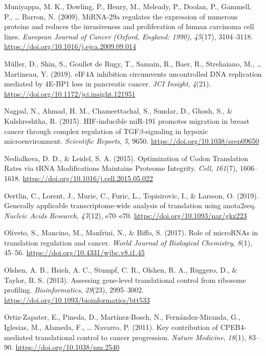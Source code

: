 \documentclass[12pt,openany]{book}
\begin{document}
\hypertarget{ref-Muniyappa2009}{}
Muniyappa, M. K., Dowling, P., Henry, M., Meleady, P., Doolan, P.,
Gammell, P., \ldots{} Barron, N. (2009). MiRNA-29a regulates the
expression of numerous proteins and reduces the invasiveness and
proliferation of human carcinoma cell lines. \emph{European Journal of
Cancer (Oxford, England: 1990)}, \emph{45}(17), 3104--3118.
\url{https://doi.org/10.1016/j.ejca.2009.09.014}

\hypertarget{ref-Muller2019}{}
Müller, D., Shin, S., Goullet de Rugy, T., Samain, R., Baer, R.,
Strehaiano, M., \ldots{} Martineau, Y. (2019). eIF4A inhibition
circumvents uncontrolled DNA replication mediated by 4E-BP1 loss in
pancreatic cancer. \emph{JCI Insight}, \emph{4}(21).
\url{https://doi.org/10.1172/jci.insight.121951}

\hypertarget{ref-Nagpal2015}{}
Nagpal, N., Ahmad, H. M., Chameettachal, S., Sundar, D., Ghosh, S., \&
Kulshreshtha, R. (2015). HIF-inducible miR-191 promotes migration in
breast cancer through complex regulation of TGF\(\beta\)-signaling in
hypoxic microenvironment. \emph{Scientific Reports}, \emph{5}, 9650.
\url{https://doi.org/10.1038/srep09650}

\hypertarget{ref-Nedialkova2015}{}
Nedialkova, D. D., \& Leidel, S. A. (2015). Optimization of Codon
Translation Rates via tRNA Modifications Maintains Proteome Integrity.
\emph{Cell}, \emph{161}(7), 1606--1618.
\url{https://doi.org/10.1016/j.cell.2015.05.022}

\hypertarget{ref-Oertlin2019}{}
Oertlin, C., Lorent, J., Murie, C., Furic, L., Topisirovic, I., \&
Larsson, O. (2019). Generally applicable transcriptome-wide analysis of
translation using anota2seq. \emph{Nucleic Acids Research},
\emph{47}(12), e70--e70. \url{https://doi.org/10.1093/nar/gkz223}

\hypertarget{ref-Oliveto2017}{}
Oliveto, S., Mancino, M., Manfrini, N., \& Biffo, S. (2017). Role of
microRNAs in translation regulation and cancer. \emph{World Journal of
Biological Chemistry}, \emph{8}(1), 45--56.
\url{https://doi.org/10.4331/wjbc.v8.i1.45}

\hypertarget{ref-Olshen2013}{}
Olshen, A. B., Hsieh, A. C., Stumpf, C. R., Olshen, R. A., Ruggero, D.,
\& Taylor, B. S. (2013). Assessing gene-level translational control from
ribosome profiling. \emph{Bioinformatics}, \emph{29}(23), 2995--3002.
\url{https://doi.org/10.1093/bioinformatics/btt533}

\hypertarget{ref-Ortiz-Zapater2011}{}
Ortiz-Zapater, E., Pineda, D., Martínez-Bosch, N., Fernández-Miranda,
G., Iglesias, M., Alameda, F., \ldots{} Navarro, P. (2011). Key
contribution of CPEB4-mediated translational control to cancer
progression. \emph{Nature Medicine}, \emph{18}(1), 83--90.
\url{https://doi.org/10.1038/nm.2540}
\end{document}
